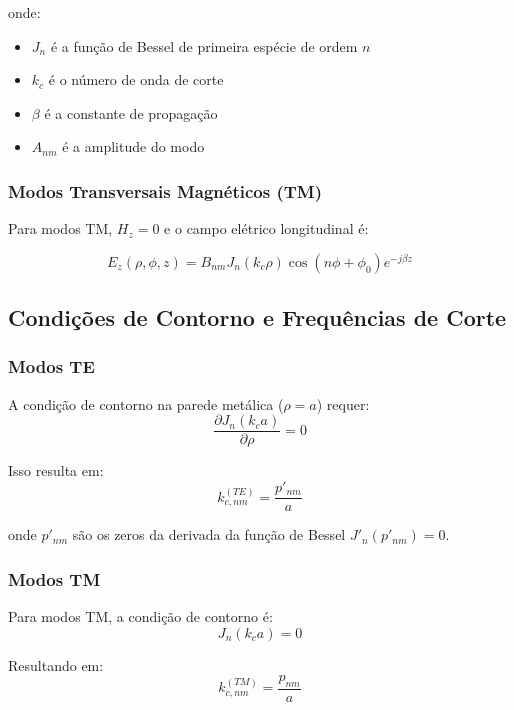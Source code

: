 \documentclass[a4paper,12pt]{article}
\begin{document}
onde:
\begin{itemize}
    \item $J_n$ é a função de Bessel de primeira espécie de ordem $n$
    \item $k_c$ é o número de onda de corte
    \item $\beta$ é a constante de propagação
    \item $A_{nm}$ é a amplitude do modo
\end{itemize}

\subsubsection{Modos Transversais Magnéticos (TM)}
Para modos TM, $H_z = 0$ e o campo elétrico longitudinal é:

\begin{equation}
E_z(\rho,\phi,z) = B_{nm} J_n(k_c\rho) \cos(n\phi + \phi_0) e^{-j\beta z}
\end{equation}

\subsection{Condições de Contorno e Frequências de Corte}

\subsubsection{Modos TE}
A condição de contorno na parede metálica ($\rho = a$) requer:
\begin{equation}
\frac{\partial J_n(k_c a)}{\partial \rho} = 0
\end{equation}

Isso resulta em:
\begin{equation}
k_{c,nm}^{(TE)} = \frac{p'_{nm}}{a}
\end{equation}

onde $p'_{nm}$ são os zeros da derivada da função de Bessel $J'_n(p'_{nm}) = 0$.

\subsubsection{Modos TM}
Para modos TM, a condição de contorno é:
\begin{equation}
J_n(k_c a) = 0
\end{equation}

Resultando em:
\begin{equation}
k_{c,nm}^{(TM)} = \frac{p_{nm}}{a}
\end{equation}
\end{document}
